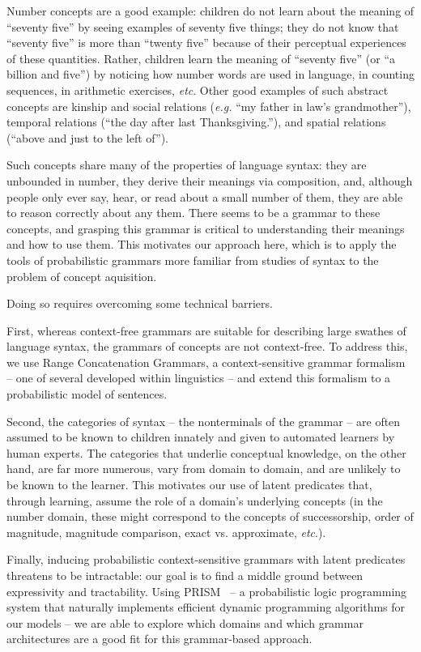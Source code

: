 \documentclass{article} %
\begin{document}
Number concepts are a good example: children do not learn about the
meaning of ``seventy five'' by seeing examples of seventy five things;
they do not know that ``seventy five'' is more than ``twenty five''
because of their perceptual experiences of these quantities. Rather,
children learn the meaning of ``seventy five'' (or ``a billion and
five'') by noticing how number words are used in language, in counting
sequences, in arithmetic exercises, {\it etc}. Other good examples of such
abstract concepts are kinship and social relations ({\it e.g.} ``my father
in law's grandmother''), temporal relations (``the day after last
Thanksgiving.''), and spatial relations (``above and just to the left
of'').

Such concepts share many of the properties of
language syntax: they are unbounded in number, they derive
their meanings via composition, and, although people only ever say,
hear, or read about a small number of them, they are able to reason
correctly about any them. There seems to be a grammar to these
concepts, and grasping this grammar is critical to understanding their
meanings and how to use them. This motivates our approach here, which
is to apply the tools of probabilistic grammars more familiar from
studies of syntax to the problem of concept aquisition.

Doing so requires overcoming some technical barriers.

First, whereas context-free grammars are suitable for describing large
swathes of language syntax, the grammars of concepts are not
context-free. To address this, we use Range Concatenation Grammars, a
context-sensitive grammar formalism -- one of several developed within
linguistics -- and extend this formalism to a probabilistic model of
sentences. 

Second, the categories of syntax -- the nonterminals of the grammar --
are often assumed to be known to children innately and given to
automated learners by human experts. The categories that underlie
conceptual knowledge, on the other hand, are far more numerous, vary
from domain to domain, and are unlikely to be known to the
learner. This motivates our use of latent predicates that, through
learning, assume the role of a domain's underlying concepts (in the
number domain, these might correspond to the concepts of
successorship, order of magnitude, magnitude comparison, exact
vs. approximate, {\it etc}.).

Finally, inducing probabilistic context-sensitive grammars with latent
predicates threatens to be intractable: our goal is to find a
middle ground between expressivity and tractability. Using
PRISM~\cite{DBLP:journals/jair/SatoK01} -- a probabilistic logic programming system that naturally
implements efficient dynamic programming algorithms for our models --
we are able to explore which domains and which grammar architectures
are a good fit for this grammar-based approach.
\end{document}

